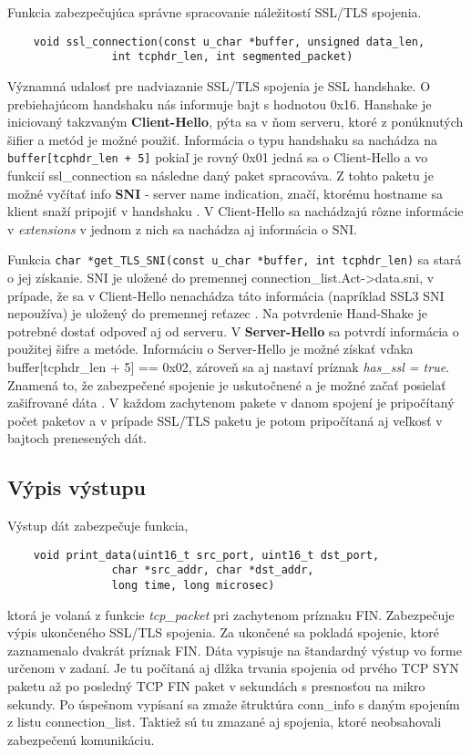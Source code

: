\documentclass[11pt, a4paper]{article}
\begin{document}
	Funkcia zabezpečujúca správne spracovanie náležitostí SSL/TLS spojenia.
\begin{lstlisting}
	void ssl_connection(const u_char *buffer, unsigned data_len, 
				int tcphdr_len, int segmented_packet)
\end{lstlisting}
	
	Významná udalosť pre nadviazanie SSL/TLS spojenia je SSL handshake. O prebiehajúcom handshaku nás informuje bajt s hodnotou 0x16. Hanshake je iniciovaný takzvaným \textbf{Client-Hello}, pýta sa v ňom serveru, ktoré z ponúknutých šifier a metód je možné použiť. Informácia o typu handshaku sa nachádza na \texttt{buffer[tcphdr\_len + 5]} pokiaľ je rovný 0x01 jedná sa o Client-Hello a vo funkcií ssl\_connection sa následne daný paket spracováva. Z tohto paketu je možné vyčítať info \textbf{SNI} - server name indication, značí, ktorému hostname sa klient snaží pripojiť v handshaku \cite{wikiSNI}. V Client-Hello sa nachádzajú rôzne informácie v \emph{extensions} v jednom z nich sa nachádza aj informácia o SNI. 
	
Funkcia \texttt{char *get\_TLS\_SNI(const u\_char *buffer, int tcphdr\_len)} sa stará o jej získanie. SNI je uložené do premennej connection\_list.Act->data.sni, v prípade, že sa v Client-Hello nenachádza táto informácia (napríklad SSL3 SNI nepoužíva) je uložený do premennej reťazec . 
	Na potvrdenie Hand-Shake je potrebné dostať odpoveď aj od serveru. V \textbf{Server-Hello} sa potvrdí informácia o použitej šifre a metóde. Informáciu o Server-Hello je možné získať vďaka buffer[tcphdr\_len + 5] == 0x02, zároveň sa aj nastaví príznak \emph{has\_ssl = true}. Znamená to, že zabezpečené spojenie je uskutočnené a je možné začať posielať zašifrované dáta \cite{ssltraffic}. 
	V každom zachytenom pakete v danom spojení je pripočítaný počet paketov a v prípade SSL/TLS paketu je potom pripočítaná aj veľkosť v bajtoch prenesených dát.
	
	\subsection{Výpis výstupu}
	Výstup dát zabezpečuje funkcia,
	\begin{lstlisting}
	void print_data(uint16_t src_port, uint16_t dst_port, 
				char *src_addr, char *dst_addr, 
				long time, long microsec)
	\end{lstlisting}
	ktorá je volaná z funkcie \emph{tcp\_packet} pri zachytenom príznaku FIN. Zabezpečuje výpis ukončeného SSL/TLS spojenia. Za ukončené sa pokladá spojenie, ktoré zaznamenalo dvakrát príznak FIN. Dáta vypisuje na štandardný výstup vo forme určenom v zadaní. Je tu počítaná aj dlžka trvania spojenia od prvého TCP SYN paketu až po posledný TCP FIN paket v sekundách s presnosťou na mikro sekundy. Po úspešnom vypísaní sa zmaže štruktúra conn\_info s daným spojením z listu connection\_list. Taktiež sú tu zmazané aj spojenia, ktoré neobsahovali zabezpečenú komunikáciu. 
	
\end{document}

